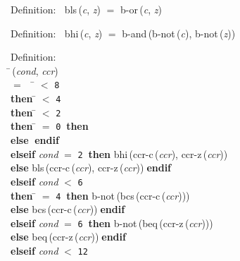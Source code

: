 \begin{tabbing}{\sc Definition}:$\;\;$
{\rm{bls}}\,({\it{c\/}}, {\it{z\/}}) $=$ {\rm{b-or}}\,({\it{c\/}}, {\it{z\/}})
\end{tabbing}

\begin{tabbing}{\sc Definition}:$\;\;$
{\rm{bhi}}\,({\it{c\/}}, {\it{z\/}}) $=$ {\rm{b-and}}\,({\rm{b-not}}\,({\it{c\/}}), {\rm{b-not}}\,({\it{z\/}}))
\end{tabbing}

\begin{tabbing}{\sc Definition}: \\  
\=\,({\it{cond\/}}, {\it{ccr\/}}) \\ 
$=$$\;\;\;\;$\= $<$ {\tt{8}} \\ 
{\bf then }\= $<$ {\tt{4}} \\ 
{\bf then }\= $<$ {\tt{2}} \\ 
{\bf then }\= $=$ {\tt{0}}$\;\;${\bf then }{} \\ 
{\bf else }{}$\;${\bf  endif}\- \\ 
{\bf elseif }{\it{cond\/}} $=$ {\tt{2}}$\;\;${\bf then }{\rm{bhi}}\,({\rm{ccr-c}}\,({\it{ccr\/}}), {\rm{ccr-z}}\,({\it{ccr\/}})) \\ 
{\bf else }{\rm{bls}}\,({\rm{ccr-c}}\,({\it{ccr\/}}), {\rm{ccr-z}}\,({\it{ccr\/}}))$\;${\bf  endif}\- \\ 
{\bf elseif }{\it{cond\/}} $<$ {\tt{6}} \\ 
{\bf then }\= $=$ {\tt{4}}$\;\;${\bf then }{\rm{b-not}}\,({\rm{bcs}}\,({\rm{ccr-c}}\,({\it{ccr\/}}))) \\ 
{\bf else }{\rm{bcs}}\,({\rm{ccr-c}}\,({\it{ccr\/}}))$\;${\bf  endif}\- \\ 
{\bf elseif }{\it{cond\/}} $=$ {\tt{6}}$\;\;${\bf then }{\rm{b-not}}\,({\rm{beq}}\,({\rm{ccr-z}}\,({\it{ccr\/}}))) \\ 
{\bf else }{\rm{beq}}\,({\rm{ccr-z}}\,({\it{ccr\/}}))$\;${\bf  endif}\- \\ 
{\bf elseif }{\it{cond\/}} $<$ {\tt{12}} \\ 
$$
\end{tabbing}
